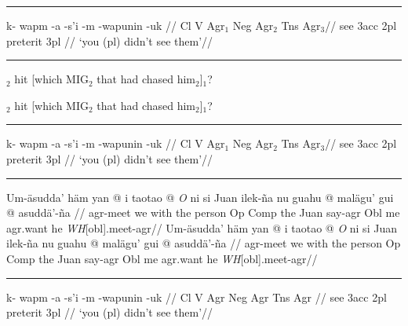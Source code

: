 \filbreak\hrule\medskip

\begingroup
\ex
\begingl
\gla \rightcomment{[Potawatami]}k- wapm -a -s'i -m -wapunin -uk //
\glb {}Cl V Agr$_1$ Neg Agr$_2$ Tns Agr$_3$//
 see {\sc 3acc} {} {\sc 2pl} preterit {\sc 3pl} //
\glft `you (pl) didn't see them'//
\endgl
\xe
\endgroup
\bigskip

\filbreak\hrule\medskip

\begingroup
\pex
\a{}$_2$ hit [which
MIG$_2$ that had chased him$_2$]$_1$?

\a{}$_2$ hit [which MIG$_2$ that had
chased him$_2$]$_1$?
\xe
\endgroup
\bigskip

\filbreak\hrule\medskip

\begingroup
\hsize=3.5in
\ex
\rightcomment{[Potawatami]}
\begingl
\gla k- wapm -a -s'i -m -wapunin -uk //
\glb {}Cl V Agr$_1$ Neg Agr$_2$ Tns Agr$_3$//
 see {\sc 3acc} {} {\sc 2pl} preterit {\sc 3pl} //
\glft `you (pl) didn't see them'//
\endgl
\xe
\endgroup
\bigskip

\filbreak\hrule\medskip

\begingroup
\pex[extraglskip=2pt]
\a \begingl
\gla Um-\"asudda' h\"am yan \nogloss{$[\,$} @ i taotao \nogloss{$[\,$} @ {\it O\/}
ni si Juan ilek-\~na nu guahu \nogloss{$[\,$} @ mal\"agu' gui
\nogloss{$[\,$} @
asudd\"a'-\~na \nogloss{{\it t\/}$\,]]]]$.}//
\glb agr-meet we with the person Op Comp the Juan say-agr Obl me
agr.want he {\it WH\/}[obl].meet-agr//
\endgl
\a \begingl[extraglskip=!.5ex]
\gla Um-\"asudda' h\"am yan \nogloss{$[\,$} @ i taotao \nogloss{$[\,$} @ {\it O\/}
ni si Juan ilek-\~na nu guahu \nogloss{$[\,$} @ mal\"agu' gui
\nogloss{$[\,$} @
asudd\"a'-\~na \nogloss{{\it t\/}$\,]]]]$.}//
\glb agr-meet we with the person Op Comp the Juan say-agr Obl me
agr.want he {\it WH\/}[obl].meet-agr//
\endgl
\xe
\endgroup
\bigskip

\filbreak\hrule\medskip

\begingroup
{}

\ex
\begingl
\gla k- wapm -a -s'i -m -wapunin -uk //
\glcat Cl V Agr Neg Agr Tns Agr //
 see {3\sc acc} {} {2\sc pl} preterit {3\sc pl} //
\glft `you (pl) didn't see them'//
\endgl
\xe
\endgroup
\bigskip

